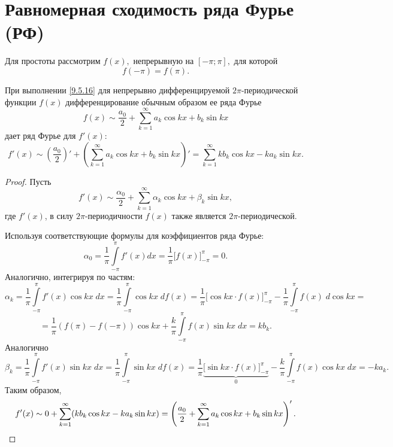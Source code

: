 \documentclass[../../main.tex]{subfiles}
\begin{document}
\section{Равномерная сходимость ряда Фурье (РФ)}
	Для простоты рассмотрим $f(x),$ непрерывную на $[-\pi; \pi],$ для которой 
	\begin{equation}\label{9.5.16}
	f(-\pi) = f(\pi).
	\end{equation}
	\begin{thm}
		При выполнении \eqref{9.5.16} для непрерывно дифференцируемой 
		$2\pi$-периодической функции $f(x)$ дифференцирование обычным образом ее ряда 
		Фурье
		\[
		f(x) \sim \frac{a_0}{2} + \sum_{k=1}^{\infty}  a_k \cos k x +
		b_k \sin k x
		\]
		дает ряд Фурье для $f'(x):$
		\begin{equation} \label{9.5.17}
			f'(x) \sim \left(\frac{a_0}{2}\right)' + \left(\sum_{k=1}^{\infty}  a_k 
			\cos k x +
			b_k \sin k x\right)' = \sum_{k=1}^{\infty} k b_k \cos k x - k
			a_k \sin k x.
		\end{equation}
	\end{thm}
	\begin{proof}
		Пусть
		\[
			f'(x) \sim \frac{\alpha_0}{2} + \sum_{k=1}^{\infty}  \alpha_k \cos k x +
			\beta_k \sin k x,
		\]
		где $f'(x)$, в силу $2\pi$-периодичности $f(x)$ также является 
		$2\pi$-периодической.
		
		Используя соответствующие формулы для коэффициентов ряда Фурье:
		\[
			\alpha_0 = \frac{1}{\pi} \int\limits_{-\pi}^{\pi} f'(x) dx = \frac{1}{\pi} 
			\big[f(x)\big]_{-\pi}^{\pi} = 0.
		\]
		Аналогично, интегрируя по частям:
		\[
			\alpha_k = \frac{1}{\pi} \int\limits_{-\pi}^{\pi} f'(x) \cos kx\; dx = 
			\frac{1}{\pi} 
			\int\limits_{-\pi}^{\pi} \cos kx\; df(x)  = \frac{1}{\pi} \big[\cos kx
			\cdot f(x)\big]_{-\pi}^{\pi} -
			\frac{1}{\pi} \int\limits_{-\pi}^{\pi} f(x)\;d \cos kx = 
			\]
			\[ =
			\frac{1}{\pi} (f(\pi) - f(-\pi)) \cos kx +
			\frac{k}{\pi} \int\limits_{-\pi}^{\pi} f(x)\sin kx\;dx = k b_k.
		\]
		Аналогично
		\[
			\beta_k = \frac{1}{\pi} \int\limits_{-\pi}^{\pi} f'(x) \sin kx\;dx
			= \frac{1}{\pi} \int\limits_{-\pi}^{\pi} \sin kx\;df(x)  =
			\frac{1}{\pi} \underbrace{\big[\sin kx \cdot f(x)\big]_{-\pi}^{\pi}}_{0} -
			\frac{k}{\pi} \int\limits_{-\pi}^{\pi} f(x) \cos kx\;dx = -ka_k.
		\]
		Таким образом, 
		\[
		f'(x) \sim 0 + \sum_{k=1}^{\infty}( k b_k \cos k x - k
		a_k \sin k x) = \left(\frac{a_0}{2} + \sum_{k=1}^{\infty}  a_k \cos k x +
		b_k \sin k x\right)'.
		\qedhere
		\]
	\end{proof}
\end{document}
